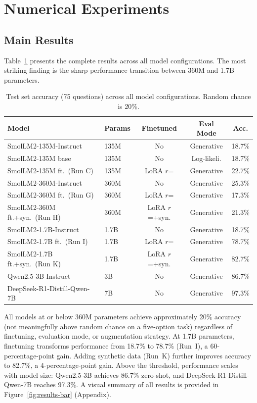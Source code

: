 \documentclass{article}
\begin{document}
\section{Numerical Experiments}

\subsection{Main Results}

Table~\ref{tab:main-results} presents the complete results across all model configurations. The most striking finding is the sharp performance transition between 360M and 1.7B parameters.

\begin{table}[h]
  \caption{Test set accuracy (75 questions) across all model configurations. Random chance is 20\%.}
  \label{tab:main-results}
  \centering
  \small
  \begin{tabular}{llccc}
    \toprule
    Model & Params & Finetuned & Eval Mode & Acc. \\
    \midrule
    SmolLM2-135M-Instruct & 135M & No & Generative & 18.7\% \\
    SmolLM2-135M base & 135M & No & Log-likeli. & 18.7\% \\
    SmolLM2-135M ft.\ (Run C) & 135M & LoRA $r$\!=\!32 & Generative & 22.7\% \\
    \midrule
    SmolLM2-360M-Instruct & 360M & No & Generative & 25.3\% \\
    SmolLM2-360M ft.\ (Run G) & 360M & LoRA $r$\!=\!32 & Generative & 17.3\% \\
    SmolLM2-360M ft.+syn.\ (Run H) & 360M & LoRA $r$\!=\!32+syn. & Generative & 21.3\% \\
    \midrule
    SmolLM2-1.7B-Instruct & 1.7B & No & Generative & 18.7\% \\
    SmolLM2-1.7B ft.\ (Run I) & 1.7B & LoRA $r$\!=\!32 & Generative & 78.7\% \\
    SmolLM2-1.7B ft.+syn.\ (Run K) & 1.7B & LoRA $r$\!=\!32+syn. & Generative & 82.7\% \\
    \midrule
    Qwen2.5-3B-Instruct & 3B & No & Generative & 86.7\% \\
    DeepSeek-R1-Distill-Qwen-7B & 7B & No & Generative & 97.3\% \\
    \bottomrule
  \end{tabular}
\end{table}

All models at or below 360M parameters achieve approximately 20\% accuracy (not meaningfully above random chance on a five-option task) regardless of finetuning, evaluation mode, or augmentation strategy. At 1.7B parameters, finetuning transforms performance from 18.7\% to 78.7\% (Run~I), a 60-percentage-point gain. Adding synthetic data (Run~K) further improves accuracy to 82.7\%, a 4-percentage-point gain. Above the threshold, performance scales with model size: Qwen2.5-3B achieves 86.7\% zero-shot, and DeepSeek-R1-Distill-Qwen-7B reaches 97.3\%. A visual summary of all results is provided in Figure~\ref{fig:results-bar} (Appendix).
\end{document}
